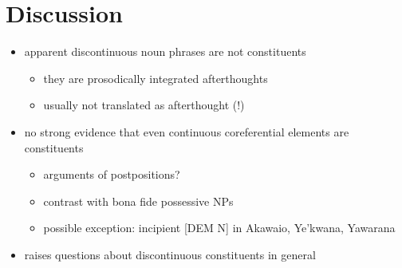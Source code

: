 \documentclass[10pt]{article}
\begin{document}
\section{Discussion}

\begin{itemize}
\tightlist
\item
  apparent discontinuous noun phrases are not constituents

  \begin{itemize}
  \tightlist
  \item
    they are prosodically integrated afterthoughts
  \item
    usually not translated as afterthought (!)
  \end{itemize}
\item
  no strong evidence that even continuous coreferential elements are
  constituents

  \begin{itemize}
  \tightlist
  \item
    arguments of postpositions?
  \item
    contrast with bona fide possessive NPs
  \item
    possible exception: incipient {[}DEM N{]} in Akawaio, Ye'kwana,
    Yawarana
  \end{itemize}
\item
  raises questions about discontinuous constituents in general
\end{itemize}

\printbibliography
\end{document}
